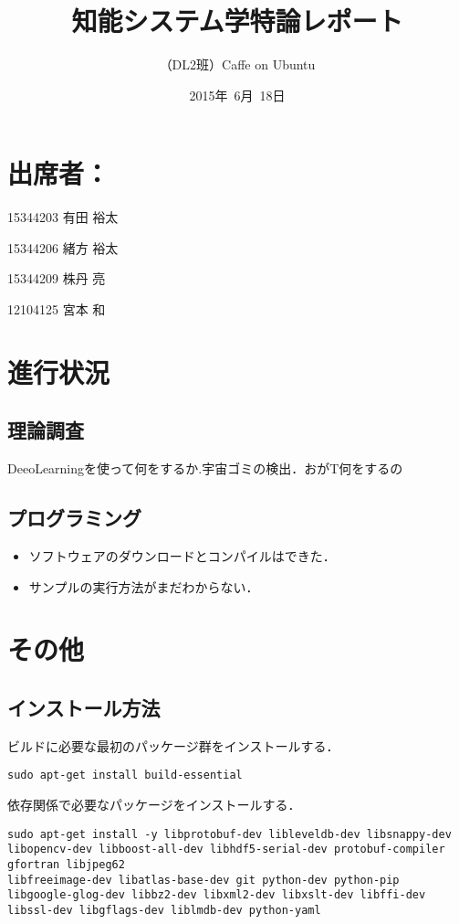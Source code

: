 \documentclass[a4paper,10pt]{jsarticle}
\title{知能システム学特論レポート}
\author{
（DL2班）Caffe on Ubuntu\\
}
\date{2015年\ 6月\ 18日}
\begin{document}
\maketitle
\section{出席者：}
\begin{list}%
 {} %
 {} %
 \item 15344203 有田 裕太
 \item 15344206 緒方 裕太
 \item 15344209 株丹 亮
 \item 12104125 宮本 和
\end{list}
\section{進行状況}
\subsection{理論調査}
DeeoLearningを使って何をするか.宇宙ゴミの検出．おがT何をするの

\subsection{プログラミング}
\begin{itemize}
 \item ソフトウェアのダウンロードとコンパイルはできた．
 \item サンプルの実行方法がまだわからない．
\end{itemize}

\section{その他}
\subsection{インストール方法}

ビルドに必要な最初のパッケージ群をインストールする．
\begin{lstlisting}[basicstyle=\ttfamily\footnotesize, frame=single]
sudo apt-get install build-essential
\end{lstlisting}

依存関係で必要なパッケージをインストールする．
\begin{lstlisting}[basicstyle=\ttfamily\footnotesize, frame=single]
sudo apt-get install -y libprotobuf-dev libleveldb-dev libsnappy-dev
libopencv-dev libboost-all-dev libhdf5-serial-dev protobuf-compiler gfortran libjpeg62
libfreeimage-dev libatlas-base-dev git python-dev python-pip
libgoogle-glog-dev libbz2-dev libxml2-dev libxslt-dev libffi-dev
libssl-dev libgflags-dev liblmdb-dev python-yaml
\end{lstlisting}
\end{document}
